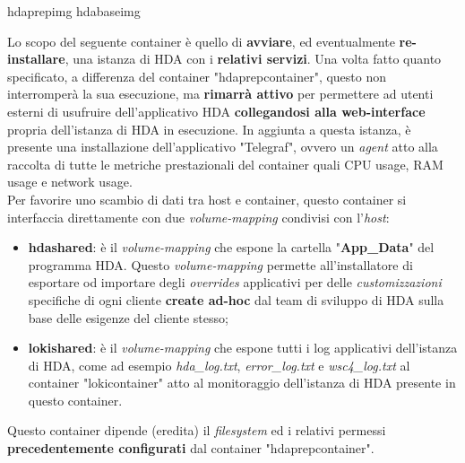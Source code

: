 \begin{namespacedesc}
	 {hdaprepimg}
	 {hdabaseimg}
	 {Lo scopo del seguente container è quello di \textbf{avviare}, ed eventualmente \textbf{re-installare}, una istanza di HDA con i \textbf{relativi servizi}. Una volta fatto quanto specificato, a differenza del container "hdaprepcontainer", questo non interromperà la sua esecuzione, ma \textbf{rimarrà attivo} per permettere ad utenti esterni di usufruire dell'applicativo HDA \textbf{collegandosi alla web-interface} propria dell'istanza di HDA in esecuzione. In aggiunta a questa istanza, è presente una installazione dell'applicativo "Telegraf", ovvero un \textit{agent} atto alla raccolta di tutte le metriche prestazionali del container quali CPU usage, RAM usage e network usage. \\
Per favorire uno scambio di dati tra host e container, questo container si interfaccia direttamente con due \textit{volume-mapping} condivisi con l'\textit{host}:
\begin{itemize}
	\item \textbf{hdashared}: è il \textit{volume-mapping} che espone la cartella "\textbf{App\_Data}" del programma HDA. Questo \textit{volume-mapping} permette all'installatore di esportare od importare degli \textit{overrides} applicativi per delle \textit{customizzazioni} specifiche di ogni cliente \textbf{create ad-hoc} dal team di sviluppo di HDA sulla base delle esigenze del cliente stesso;
	\item \textbf{lokishared}: è il \textit{volume-mapping} che espone tutti i log applicativi dell'istanza di HDA, come ad esempio \textit{hda\_log.txt}, \textit{error\_log.txt} e \textit{wsc4\_log.txt} al container "lokicontainer" atto al monitoraggio dell'istanza di HDA presente in questo container.
\end{itemize}
Questo container dipende (eredita) il \textit{filesystem} ed i relativi permessi \textbf{precedentemente configurati} dal container "hdaprepcontainer".}
\end{namespacedesc}

